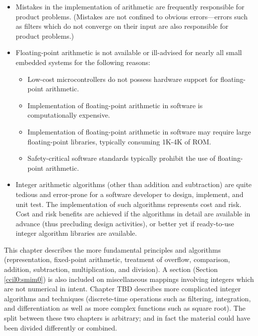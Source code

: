 \begin{itemize}
\item Mistakes in the implementation of arithmetic are frequently
      responsible for product problems.  (Mistakes are not confined
      to obvious errors---errors such as filters which do not converge
      on their input are also responsible for product problems.)
\item Floating-point arithmetic is not available or ill-advised
      for nearly all small embedded systems for the following reasons:
      \begin{itemize}
      \item Low-cost microcontrollers do not possess hardware support for
            floating-point arithmetic.
      \item Implementation of floating-point arithmetic in software is
            computationally expensive.
      \item Implementation of floating-point arithmetic in software may
            require large floating-point libraries, typically consuming
            1K-4K of ROM.
      \item Safety-critical software standards typically prohibit the
            use of floating-point arithmetic.
      \end{itemize}
\item Integer arithmetic algorithms (other than addition and subtraction)
      are quite tedious and error-prone for a software developer to design, implement, and
      unit test.  The implementation of such algorithms represents
      cost and risk.  Cost and risk benefits are achieved if the algorithms in detail are 
      available in advance (thus precluding design activities), or
      better yet if ready-to-use integer algorithm libraries are available.
\end{itemize}

This chapter describes the more fundamental principles and algorithms
(representation, fixed-point arithmetic, treatment of overflow, comparison,
addition, subtraction, multiplication, and division).  A section 
(Section \ref{ccil0:smim0}) is also included 
on miscellaneous mappings involving integers which
are not numerical in intent.
Chapter %
TBD
describes more complicated 
integer algorithms and techniques (discrete-time operations
such as filtering, integration, and differentiation as well as more
complex functions such as square root).  The split between these two chapters
is arbitrary; and in fact the material could have been divided differently
or combined.

